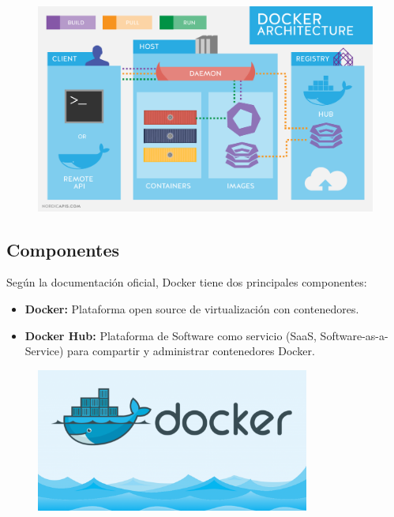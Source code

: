 \documentclass[preprint,12pt]{elsarticle}
\begin{document}
\begin{figure}[htb]
	\begin{center}
		\includegraphics[width=13cm]{./IMAGENES/arquitectura}
	\end{center}
\end{figure}

\subsection{\textbf{Componentes}}
Según la documentación oficial, Docker tiene dos principales componentes:

\begin{itemize}
\item \textbf{Docker:} Plataforma open source de virtualización con contenedores.
\item \textbf{Docker Hub:} Plataforma de Software como servicio (SaaS, Software-as-a-Service) para compartir y administrar contenedores Docker.
\end{itemize}

\begin{figure}[htb]
	\begin{center}
		\includegraphics[width=9cm]{./IMAGENES/docker}
	\end{center}
\end{figure}
\end{document}
